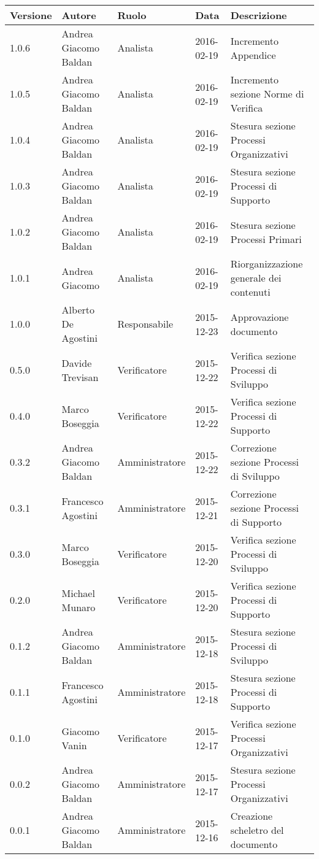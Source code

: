 \documentclass{scalatekids-article}
\begin{document}
\begin{center}
    \begin{tabular}{| l | l | l | l | l |}
        \hline
        Versione & Autore & Ruolo & Data & Descrizione \\
        \hline
        1.0.6 & Andrea Giacomo Baldan & Analista & 2016-02-19 & Incremento Appendice\\
        \hline
        1.0.5 & Andrea Giacomo Baldan & Analista & 2016-02-19 & Incremento sezione Norme di Verifica\\
        \hline
        1.0.4 & Andrea Giacomo Baldan & Analista & 2016-02-19 & Stesura sezione Processi Organizzativi\\
        \hline
        1.0.3 & Andrea Giacomo Baldan & Analista & 2016-02-19 & Stesura sezione Processi di Supporto\\
        \hline
        1.0.2 & Andrea Giacomo Baldan & Analista & 2016-02-19 & Stesura sezione Processi Primari\\
        \hline
        1.0.1 & Andrea Giacomo & Analista & 2016-02-19 & Riorganizzazione generale dei contenuti\\
        \hline
        1.0.0 & Alberto De Agostini & Responsabile & 2015-12-23 & Approvazione documento\\
        \hline
        0.5.0 & Davide Trevisan & Verificatore & 2015-12-22 & Verifica sezione Processi di Sviluppo\\
        \hline
        0.4.0 & Marco Boseggia & Verificatore & 2015-12-22 & Verifica sezione Processi di Supporto\\
        \hline
        0.3.2 & Andrea Giacomo Baldan & Amministratore & 2015-12-22 & Correzione sezione Processi di Sviluppo\\
        \hline
        0.3.1 & Francesco Agostini & Amministratore & 2015-12-21 & Correzione sezione Processi di Supporto\\
        \hline
        0.3.0 & Marco Boseggia & Verificatore & 2015-12-20 & Verifica sezione Processi di Sviluppo\\
        \hline
        0.2.0 & Michael Munaro & Verificatore & 2015-12-20 & Verifica sezione Processi di Supporto\\
        \hline
        0.1.2 & Andrea Giacomo Baldan & Amministratore & 2015-12-18 & Stesura sezione Processi di Sviluppo\\
        \hline
        0.1.1 & Francesco Agostini & Amministratore & 2015-12-18 & Stesura sezione Processi di Supporto\\
        \hline
        0.1.0 & Giacomo Vanin & Verificatore & 2015-12-17 & Verifica sezione Processi Organizzativi\\
        \hline
        0.0.2 & Andrea Giacomo Baldan & Amministratore & 2015-12-17 & Stesura sezione Processi Organizzativi\\
        \hline
        0.0.1 & Andrea Giacomo Baldan & Amministratore & 2015-12-16 & Creazione scheletro del documento\\
        \hline
    \end{tabular}
\end{center}
\tableofcontents
\newpage
{}
\end{document}
